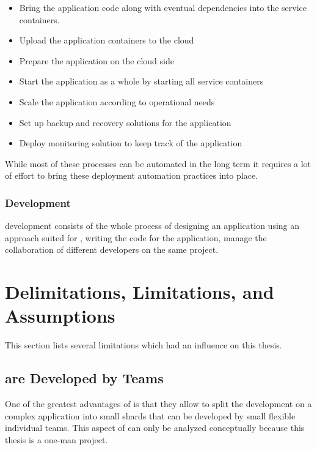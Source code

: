 \begin{itemize}
  \item Bring the application code along with eventual dependencies into the
  service containers.
  \item Upload the application containers to the cloud
  \item Prepare the application on the cloud side
  \item Start the application as a whole by starting all service containers
  \item Scale the application according to operational needs
  \item Set up backup and recovery solutions for the application
  \item Deploy monitoring solution to keep track of the application
\end{itemize}

While most of these processes can be automated in the long term it requires a
lot of effort to bring these deployment automation practices into place.

\subsubsection{\ms{} Development}

\ms{} development consists of the whole process of designing an application
using an approach suited for \ms{}, writing the code for the application, manage
the collaboration of different developers on the same project.

\section{Delimitations, Limitations, and Assumptions}

This section lists several limitations which had an influence on this
thesis.

\subsection{\ms{} are Developed by Teams}
One of the greatest advantages of \mss{} is that they allow to split the
development on a complex application into small shards that can be developed by
small flexible individual teams. This aspect of \mss{} can only be analyzed
conceptually because this thesis is a one-man project.


